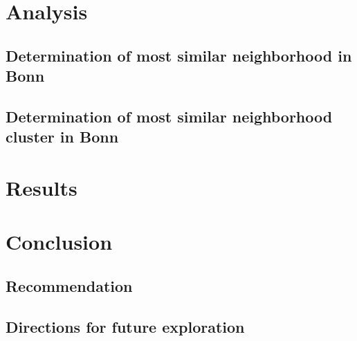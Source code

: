 \documentclass[UKenglish]{scrreprt}
\begin{document}
\chapter{Analysis}

\section{Determination of most similar neighborhood in Bonn}

\section{Determination of most similar neighborhood cluster in Bonn}

\chapter{Results}

\chapter{Conclusion}
\section{Recommendation}
\section{Directions for future exploration}
\end{document}
